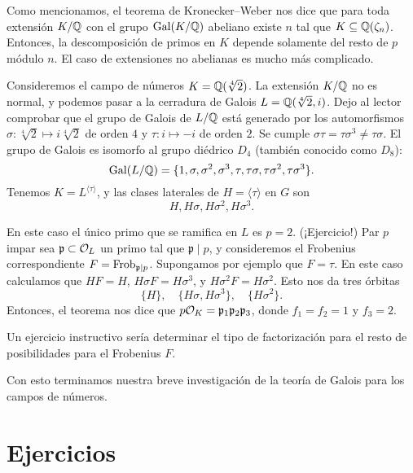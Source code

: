 Como mencionamos, el teorema de Kronecker--Weber nos dice que para toda
extensión $K/\mathbb{Q}$ con el grupo $\operatorname{Gal} (K/\mathbb{Q})$ abeliano existe $n$ tal que
$K \subseteq \mathbb{Q} (\zeta_n)$. Entonces, la descomposición de primos en $K$
depende solamente del resto de $p$ módulo $n$. El caso de extensiones no
abelianas es mucho más complicado.

\begin{ejemplo}
  Consideremos el campo de números $K = \mathbb{Q} (\sqrt[4]{2})$. La extensión $K/\mathbb{Q}$
  no es normal, y podemos pasar a la cerradura de Galois
  $L = \mathbb{Q} (\sqrt[4]{2},i)$. Dejo al lector comprobar que el grupo de Galois de
  $L/\mathbb{Q}$ está generado por los automorfismos
  $\sigma\colon \sqrt[4]{2} \mapsto i\sqrt[4]{2}$ de orden $4$ y
  $\tau\colon i \mapsto -i$ de orden $2$. Se cumple
  $\sigma\tau = \tau\sigma^3 \ne \tau\sigma$. El grupo de Galois es isomorfo al
  grupo diédrico $D_4$ (también conocido como $D_8$):
  \[ \operatorname{Gal} (L/\mathbb{Q}) = \{ 1,\sigma,\sigma^2,\sigma^3,
                       \tau,\tau\sigma,\tau\sigma^2,\tau\sigma^3 \}. \]
  Tenemos $K = L^{\langle\tau\rangle}$, y las clases laterales de
  $H = \langle\tau\rangle$ en $G$ son
  $$H, H\sigma, H\sigma^2, H\sigma^3.$$

  En este caso el único primo que se ramifica en $L$ es $p = 2$. (¡Ejercicio!)
  Par $p$ impar sea $\mathfrak{p} \subset \mathcal{O}_L$ un primo tal que
  $\mathfrak{p}\mid p$, y consideremos el Frobenius correspondiente
  $F = \operatorname{Frob}_{\mathfrak{p}|p}$. Supongamos por ejemplo que $F = \tau$.
  En este caso calculamos que $HF = H$, $H\sigma F = H\sigma^3$,
  y $H\sigma^2 F = H\sigma^2$. Esto nos da tres órbitas
  $$\{ H \}, \quad \{ H\sigma, H\sigma^3 \}, \quad \{ H\sigma^2 \}.$$
  Entonces, el teorema nos dice que
  $p\mathcal{O}_K = \mathfrak{p}_1\mathfrak{p}_2\mathfrak{p}_3$, donde
  $f_1 = f_2 = 1$ y $f_3 = 2$.

  Un ejercicio instructivo sería determinar el tipo de factorización para
  el resto de posibilidades para el Frobenius $F$.
\end{ejemplo}

Con esto terminamos nuestra breve investigación de la teoría de Galois para los
campos de números.


\pagebreak


\section*{Ejercicios}

